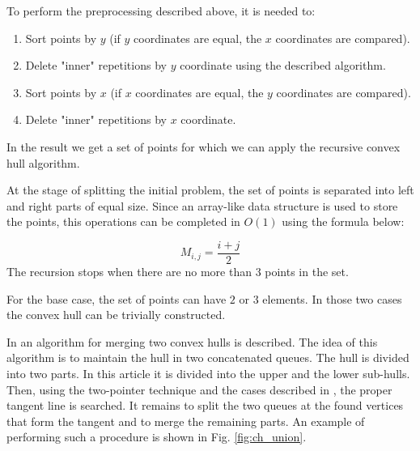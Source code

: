 \documentclass[conference]{IEEEtran}
\begin{document}
	To perform the preprocessing described above, it is needed to:
	
	\begin{enumerate}
		\item
		Sort points by $y$ (if $y$ coordinates are equal, the $x$ coordinates are compared).
		\item
		Delete "inner" repetitions by $y$ coordinate using the described algorithm.
		\item
		Sort points by $x$ (if $x$ coordinates are equal, the $y$ coordinates are compared).
		\item
		Delete "inner" repetitions by $x$ coordinate.
	\end{enumerate}

	In the result we get a set of points for which we can apply the recursive convex hull algorithm.


	At the stage of splitting the initial problem, the set of points is separated into left and right parts of equal size. Since an array-like data structure is used to store the points, this operations can be completed in $O(1)$ using the formula below:
	
	\begin{equation}
	M_{i,j}=\frac{i+j}{2}
	\end{equation}
	The recursion stops when there are no more than $3$ points in the set.
	
	For the base case, the set of points can have $2$ or $3$ elements. In those two cases the convex hull can be trivially constructed. 
	
	

	In \cite{overmars} an algorithm for merging two convex hulls is described. The idea of this algorithm is to maintain the hull in two concatenated queues. The hull is divided into two parts. In this article it is divided into the upper and the lower sub-hulls. Then, using the two-pointer technique and the cases described in \cite{overmars}, the proper tangent line is searched. 
	It remains to split the two queues at the found vertices that form the tangent and to merge the remaining parts. An example of performing such a procedure is shown in Fig. \ref{fig:ch_union}.
	
\end{document}
